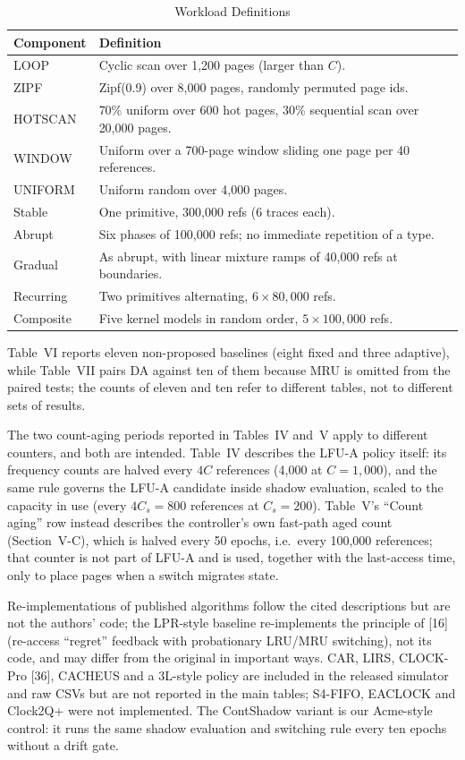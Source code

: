 \documentclass[10pt,twocolumn,a4paper]{IEEEtran}
\begin{document}
\begin{table}[!t]
\caption{Workload Definitions}
\label{tab:workloads}
\footnotesize
\begin{tabular}{@{}p{}p{}@{}}
\toprule
Component & Definition \\
\midrule
LOOP & Cyclic scan over 1,200 pages (larger than $C$). \\
ZIPF & Zipf(0.9) over 8,000 pages, randomly permuted page ids. \\
HOTSCAN & 70\% uniform over 600 hot pages, 30\% sequential scan over 20,000 pages. \\
WINDOW & Uniform over a 700-page window sliding one page per 40 references. \\
UNIFORM & Uniform random over 4,000 pages. \\
Stable & One primitive, 300,000 refs (6 traces each). \\
Abrupt & Six phases of 100,000 refs; no immediate repetition of a type. \\
Gradual & As abrupt, with linear mixture ramps of 40,000 refs at boundaries. \\
Recurring & Two primitives alternating, $6 \times 80{,}000$ refs. \\
Composite & Five kernel models in random order, $5 \times 100{,}000$ refs. \\
\bottomrule
\end{tabular}
\end{table}

Table~VI reports eleven non-proposed baselines (eight fixed and three
adaptive), while Table~VII pairs DA against ten of them because MRU is omitted
from the paired tests; the counts of eleven and ten refer to different tables,
not to different sets of results.

The two count-aging periods reported in Tables~IV and~V apply to different
counters, and both are intended. Table~IV describes the LFU-A policy itself:
its frequency counts are halved every $4C$ references (4,000 at
$C = 1{,}000$), and the same rule governs the LFU-A candidate inside shadow
evaluation, scaled to the capacity in use (every $4C_s = 800$ references at
$C_s = 200$). Table~V's ``Count aging'' row instead describes the controller's
own fast-path aged count (Section~V-C), which is halved every 50 epochs, i.e.\
every 100,000 references; that counter is not part of LFU-A and is used,
together with the last-access time, only to place pages when a switch migrates
state.

Re-implementations of published
algorithms follow the cited descriptions but are not the authors' code; the
LPR-style baseline re-implements the principle of [16] (re-access ``regret''
feedback with probationary LRU/MRU switching), not its code, and may differ
from the original in important ways. CAR, LIRS, CLOCK-Pro [36], CACHEUS and a
3L-style policy are included in the released simulator and raw CSVs but are not
reported in the main tables; S4-FIFO, EACLOCK and Clock2Q+ were not implemented.
The ContShadow variant is our Acme-style control: it runs the same shadow
evaluation and switching rule every ten epochs without a drift gate.
\end{document}
